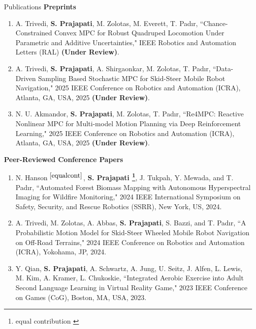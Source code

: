 \documentclass{resume}
\begin{document}
\begin{rSection}{Publications}
\textbf{Preprints}
\vspace{-1mm}
\begin{enumerate}[leftmargin=0.5cm]
\item A. Trivedi, \textbf{S. Prajapati}, M. Zolotas, M. Everett, T. Pad{\i}r, ``Chance-Constrained Convex MPC for Robust Quadruped Locomotion Under Parametric and Additive Uncertainties," IEEE Robotics and Automation Letters (RAL) \textbf{(Under Review)}.
     \item A. Trivedi, \textbf{S. Prajapati}, A. Shirgaonkar, M. Zolotas, T. Pad{\i}r, ``Data-Driven Sampling Based Stochastic MPC for Skid-Steer Mobile
Robot Navigation," 2025 IEEE Conference on Robotics and Automation (ICRA), Atlanta, GA, USA, 2025 \textbf{(Under Review)}.
    \item N. U. Akmandor, \textbf{S. Prajapati}, M. Zolotas, T. Pad{\i}r, ``Re4MPC: Reactive Nonlinear MPC for Multi-model Motion Planning via Deep Reinforcement Learning," 2025 IEEE Conference on Robotics and Automation (ICRA), Atlanta, GA, USA, 2025 \textbf{(Under Review)}.
\end{enumerate}
\vspace{-1mm}
\textbf{Peer-Reviewed Conference Papers}
\vspace{-1mm}
\begin{enumerate}[leftmargin=0.5cm]
    \item N. Hanson$^{~\ref{equalcont}}$, \textbf{S. Prajapati \footnote{equal contribution \label{equalcont}}}, J. Tukpah, Y. Mewada, and T. Pad{\i}r, ``Automated Forest Biomass Mapping with Autonomous Hyperspectral
Imaging for Wildfire Monitoring," 2024 IEEE International Symposium on Safety, Security, and Rescue Robotics (SSRR), New York, US, 2024.
    \item A. Trivedi, M. Zolotas, A. Abbas, \textbf{S. Prajapati}, S. Bazzi, and T. Pad{\i}r, ``A Probabilistic Motion Model for Skid-Steer Wheeled Mobile Robot Navigation on Off-Road Terrains," 2024 IEEE Conference on Robotics and Automation (ICRA), Yokohama, JP, 2024.
    
    \item \vspace{-0.3em} Y. Qian, \textbf{S. Prajapati}, A. Schwartz, A. Jung, U. Seitz, J. Alfen, L. Lewis, M. Kim, A. Kramer, L. Chukoskie, ``Integrated Aerobic Exercise into Adult Second Language Learning in Virtual Reality Game," 2023 IEEE Conference on Games (CoG), Boston, MA, USA, 2023.


\end{enumerate}
\end{rSection}
\end{document}
